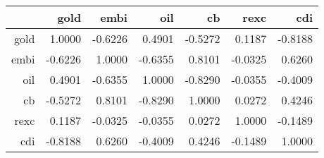 \begin{table}[ht]
\centering
\begin{tabular}{rrrrrrr}
  \hline
 & gold & embi & oil & cb & rexc & cdi \\ 
  \hline
gold & 1.0000 & -0.6226 & 0.4901 & -0.5272 & 0.1187 & -0.8188 \\ 
  embi & -0.6226 & 1.0000 & -0.6355 & 0.8101 & -0.0325 & 0.6260 \\ 
  oil & 0.4901 & -0.6355 & 1.0000 & -0.8290 & -0.0355 & -0.4009 \\ 
  cb & -0.5272 & 0.8101 & -0.8290 & 1.0000 & 0.0272 & 0.4246 \\ 
  rexc & 0.1187 & -0.0325 & -0.0355 & 0.0272 & 1.0000 & -0.1489 \\ 
  cdi & -0.8188 & 0.6260 & -0.4009 & 0.4246 & -0.1489 & 1.0000 \\ 
   \hline
\end{tabular}
\end{table}
